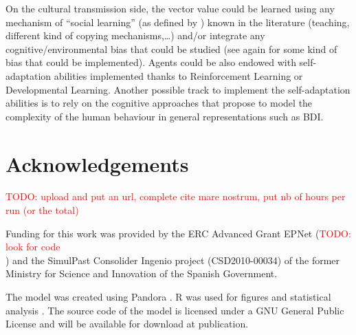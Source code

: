 \documentclass{wscpaperproc}
\newcommand{\memo}[2]{\textcolor{#1}{#2}}
\newcommand{\todo}[1]{\memo{red}{TODO: #1\\}}
\begin{document}
On the cultural transmission side, the vector value could be learned using any mechanism of ``social learning'' (as defined by \cite{lycett_cultural_2015}) known in the literature (teaching, different kind of copying mechanisms,\ldots) and/or integrate any cognitive/environmental bias that could be studied (see again \cite{lycett_cultural_2015} for some kind of bias that could be implemented). Agents could be also endowed with self-adaptation abilities implemented thanks to Reinforcement Learning or Developmental Learning. Another possible track to implement the self-adaptation abilities is to rely on the cognitive approaches that propose to model the complexity of the human behaviour in general representations such as BDI.

\section{Acknowledgements}

\todo{upload and put an url, complete cite mare nostrum, put nb of hours per run (or the total)}

Funding for this work was provided by the ERC Advanced Grant EPNet (\todo{look for code}) and the SimulPast Consolider Ingenio project (CSD2010-00034) of the former Ministry for Science and Innovation of the Spanish Government. 

The model was created using Pandora \cite{rubiocampillo_2014}. R was used for figures and statistical analysis \cite{rdev_2012}. The source code of the model is licensed under a GNU General Public License and will be available for download at publication.


  
\end{document}
